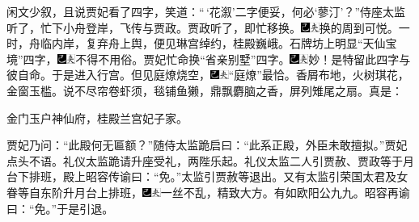 闲文少叙，且说贾妃看了四字，笑道：“\,‘花溆’二字便妥，何必‘蓼汀’？”侍座太监听了，忙下小舟登岸，飞传与贾政。贾政听了，即忙移换。{\includegraphics[width=3mm]{../Images/00003}\includegraphics[width=3mm]{../Images/00012}\footnotesize \kaishu 换的周到可悦。}一时，舟临内岸，复弃舟上舆，便见琳宫绰约，桂殿巍峨。石牌坊上明显“天仙宝境”四字，{\includegraphics[width=3mm]{../Images/00003}\includegraphics[width=3mm]{../Images/00012}\footnotesize \kaishu 不得不用俗。}贾妃忙命换“省亲别墅”四字。{\includegraphics[width=3mm]{../Images/00003}\includegraphics[width=3mm]{../Images/00012}\footnotesize \kaishu 妙！是特留此四字与彼自命。}于是进入行宫。但见庭燎烧空，{\includegraphics[width=3mm]{../Images/00003}\includegraphics[width=3mm]{../Images/00012}\footnotesize \kaishu “庭燎”最恰。}香屑布地，火树琪花，金窗玉槛。说不尽帘卷虾须，毯铺鱼獭，鼎飘麝脑之香，屏列雉尾之扇。真是：

金门玉户神仙府，桂殿兰宫妃子家。

贾妃乃问：“此殿何无匾额？”随侍太监跪启曰：“此系正殿，外臣未敢擅拟。”贾妃点头不语。礼仪太监跪请升座受礼，两陛乐起。礼仪太监二人引贾赦、贾政等于月台下排班，殿上昭容传谕曰：“免。”太监引贾赦等退出。又有太监引荣国太君及女眷等自东阶升月台上排班，{\includegraphics[width=3mm]{../Images/00003}\includegraphics[width=3mm]{../Images/00012}\footnotesize \kaishu 一丝不乱，精致大方。有如欧阳公九九。}昭容再谕曰：“免。”于是引退。


